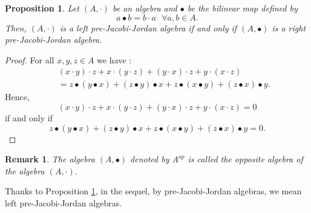 \documentclass[12pt]{amsart}
\newtheorem{remark}[Theorem]{Remark}
\newtheorem{proposition}[Theorem]{Proposition}
\begin{document}
	\begin{proposition}\label{Pro3}
		Let $ (A,\cdot) $ be an algebra and $ \bullet $ be the bilinear map defined by\\
		$$ a\bullet b=b\cdot a  \mbox{ $\forall a,b\in A.$}$$	
		Then, $ (A,\cdot) $ is a left pre-Jacobi-Jordan algebra if and only if $ (A,\bullet) $ is a right pre-Jacobi-Jordan algebra.
	\end{proposition}
	\begin{proof}
		For all $ x, y, z\in A $ we have :
		\begin{eqnarray}
			&&	(x\cdot y)\cdot z+x\cdot( y\cdot z)+(y\cdot x)\cdot z+y\cdot (x\cdot z)\nonumber\\
			&&=z\bullet(y\bullet x)+(z\bullet y)\bullet x+z\bullet(x\bullet y)
			+(z\bullet x)\bullet y.\nonumber
		\end{eqnarray}
		Hence, $$(x\cdot y)\cdot z+x\cdot( y\cdot z)+(y\cdot x)\cdot z+y\cdot (x\cdot z)=0 $$ if and only if
		$$ z\bullet(y\bullet x)+(z\bullet y)\bullet x+z\bullet(x\bullet y)
		+(z\bullet x)\bullet y=0.$$	
	\end{proof}
	\begin{remark}
		The algebra $ (A,\bullet)$  denoted  by $ A^{op}$ is called the opposite algebra of the algebra $ (A,\cdot) $.	
	\end{remark}
Thanks to Proposition \ref{Pro3}, in the sequel, by pre-Jacobi-Jordan algebras, we mean left pre-Jacobi-Jordan algebras. \\
\end{document}
